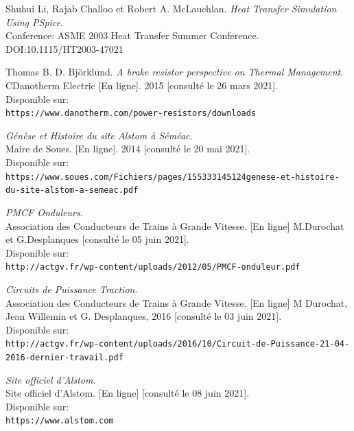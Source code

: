 \documentclass[a4paper]{report}
\begin{document}
	\renewcommand{\bibname}{Références} %
	\begin{thebibliography}{9}
		
		
		Shuhui Li, Rajab Challoo et Robert A. McLauchlan. 
		\textit{Heat Transfer Simulation Using PSpice}.\\ 
		Conference: ASME 2003 Heat Transfer Summer Conference.\\
		DOI:10.1115/HT2003-47021
		
		Thomas B. D. Björklund. 
		\textit{A brake resistor perspective on Thermal Management}.\\ 
		CDanotherm Electric [En ligne]. 2015 [consulté le 26 mars 2021].\\
		Disponible sur: \\\texttt{https://www.danotherm.com/power-resistors/downloads}
		
		\textit{Génèse et Histoire du site Alstom à Séméac}.\\
		Maire de Soues. [En ligne]. 2014 [consulté le 20 mai 2021].\\
		Disponible sur: \\\texttt{https://www.soues.com/Fichiers/pages/155333145124genese-et-histoire-du-site-alstom-a-semeac.pdf}
		
		\textit{PMCF Onduleurs}.\\
		Association des Conducteurs de Trains à Grande Vitesse. [En ligne] M.Durochat et G.Desplanques [consulté le 05 juin 2021].\\
		Disponible sur: \\\texttt{http://actgv.fr/wp-content/uploads/2012/05/PMCF-onduleur.pdf}
		
		\textit{Circuits de Puissance Traction}.\\
		Association des Conducteurs de Trains à Grande Vitesse. [En ligne] M Durochat, Jean Willemin et G. Desplanques, 2016 [consulté le 03 juin 2021].\\
		Disponible sur: \\\texttt{http://actgv.fr/wp-content/uploads/2016/10/Circuit-de-Puissance-21-04-2016-dernier-travail.pdf}
		
		\textit{Site officiel d'Alstom}.\\
		Site officiel d'Alstom. [En ligne] [consulté le 08 juin 2021].\\
		Disponible sur: \\\texttt{https://www.alstom.com}
		
	\end{thebibliography}
	
	
\end{document}
